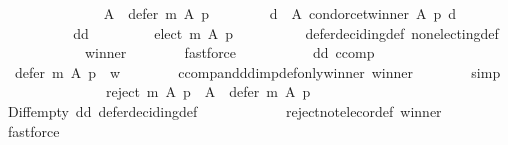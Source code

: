 \begin{isabellebody}
\ \ \ \ \ \ {\isacharparenleft}{\kern0pt}{\isacharbraceleft}{\kern0pt}{\isacharbraceright}{\kern0pt}{\isacharcomma}{\kern0pt}\isanewline
\ \ \ \ \ \ \ \ A\ {\isacharminus}{\kern0pt}\ defer\ m\ A\ p{\isacharcomma}{\kern0pt}\isanewline
\ \ \ \ \ \ \ \ {\isacharbraceleft}{\kern0pt}d\ {\isasymin}\ A{\isachardot}{\kern0pt}\ condorcet{\isacharunderscore}{\kern0pt}winner\ A\ p\ d{\isacharbraceright}{\kern0pt}{\isacharparenright}{\kern0pt}{\isachardoublequoteclose}\isanewline
\ \ \isamarkupfalse%
\ {\isacharminus}{\kern0pt}\isanewline
\ \ \ \ \isanewline
\ \ \ \ \isamarkupfalse%
\ dd\ \isamarkupfalse%
\ {}{\isacharcolon}{\kern0pt}\isanewline
\ \ \ \ \ \ {\isachardoublequoteopen}elect\ m\ A\ p\ {\isacharequal}{\kern0pt}\ {\isacharbraceleft}{\kern0pt}{\isacharbraceright}{\kern0pt}{\isachardoublequoteclose}\isanewline
\ \ \ \ \ \ \isamarkupfalse%
\ defer{\isacharunderscore}{\kern0pt}deciding{\isacharunderscore}{\kern0pt}def\ non{\isacharunderscore}{\kern0pt}electing{\isacharunderscore}{\kern0pt}def\isanewline
\ \ \ \ \ \ \ \ \ \ \ \ winner\isanewline
\ \ \ \ \ \ \isamarkupfalse%
\ fastforce\isanewline
\ \ \ \ \isanewline
\ \ \ \ \isamarkupfalse%
\ dd\ ccomp\ \isamarkupfalse%
\ {}{\isacharcolon}{\kern0pt}\ {\isachardoublequoteopen}defer\ m\ A\ p\ {\isacharequal}{\kern0pt}\ {\isacharbraceleft}{\kern0pt}w{\isacharbraceright}{\kern0pt}{\isachardoublequoteclose}\isanewline
\ \ \ \ \ \ \isamarkupfalse%
\ ccomp{\isacharunderscore}{\kern0pt}and{\isacharunderscore}{\kern0pt}dd{\isacharunderscore}{\kern0pt}imp{\isacharunderscore}{\kern0pt}def{\isacharunderscore}{\kern0pt}only{\isacharunderscore}{\kern0pt}winner\ winner\isanewline
\ \ \ \ \ \ \isamarkupfalse%
\ simp\isanewline
\ \ \ \ \isanewline
\ \ \ \ \isamarkupfalse%
\ {}\ {}\ \isamarkupfalse%
\ {}{\isacharcolon}{\kern0pt}\ {\isachardoublequoteopen}reject\ m\ A\ p\ {\isacharequal}{\kern0pt}\ A\ {\isacharminus}{\kern0pt}\ defer\ m\ A\ p{\isachardoublequoteclose}\isanewline
\ \ \ \ \ \ \isamarkupfalse%
\ Diff{\isacharunderscore}{\kern0pt}empty\ dd\ defer{\isacharunderscore}{\kern0pt}deciding{\isacharunderscore}{\kern0pt}def\isanewline
\ \ \ \ \ \ \ \ \ \ \ \ reject{\isacharunderscore}{\kern0pt}not{\isacharunderscore}{\kern0pt}elec{\isacharunderscore}{\kern0pt}or{\isacharunderscore}{\kern0pt}def\ winner\isanewline
\ \ \ \ \ \ \isamarkupfalse%
\ fastforce\isanewline

\end{isabellebody}
